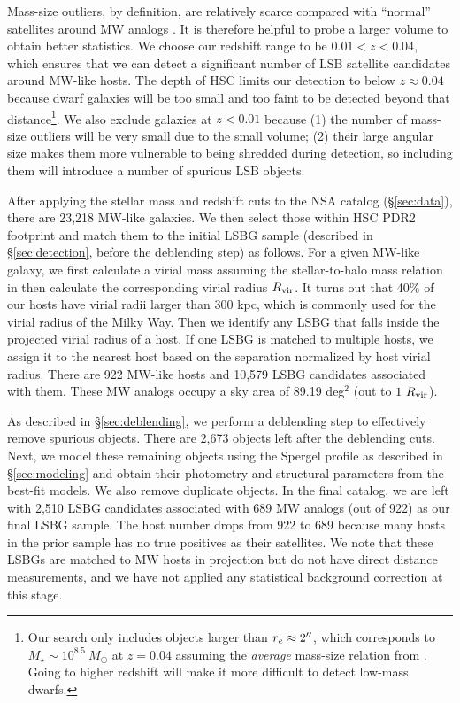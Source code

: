 \documentclass[twocolumn,astrosymb,twocolappendix]{aastex631}
\begin{document}
\begin{CJK*}{UTF8}{gbsn}
Mass-size outliers, by definition, are relatively scarce compared with ``normal'' satellites around MW analogs \citep{SAGA-II,CarlstenELVES2022}. It is therefore helpful to probe a larger volume to obtain better statistics. We choose our redshift range to be $0.01 < z < 0.04$, which ensures that we can detect a significant number of LSB satellite candidates around MW-like hosts. The depth of HSC limits our detection to below $z \approx 0.04$ because dwarf galaxies will be too small and too faint to be detected beyond that distance\footnote{Our search only includes objects larger than $r_e\approx 2\mbox{$^{\prime\prime}$}$, which corresponds to $M_\star \sim 10^{8.5}\ M_\odot$ at $z=0.04$ assuming the \textit{average} mass-size relation from \citet{ELVES-I}. Going to higher redshift will make it more difficult to detect low-mass dwarfs.}. We also exclude galaxies at $z<0.01$ because (1) the number of mass-size outliers will be very small due to the small volume; (2) their large angular size makes them more vulnerable to being shredded during detection, so including them will introduce a number of spurious LSB objects. 

After applying the stellar mass and redshift cuts to the NSA catalog (\S\ref{sec:data}), there are 23,218 MW-like galaxies. We then select those within HSC PDR2 footprint and match them to the initial LSBG sample (described in \S \ref{sec:detection}, before the deblending step) as follows. For a given MW-like galaxy, we first calculate a virial mass assuming the stellar-to-halo mass relation in \citet{Behroozi2010} then calculate the corresponding virial radius $R_{\rm vir}$. It turns out that 40\% of our hosts have virial radii larger than 300 kpc, which is commonly used for the virial radius of the Milky Way. Then we identify any LSBG that falls inside the projected virial radius of a host. If one LSBG is matched to multiple hosts, we assign it to the nearest host based on the separation normalized by host virial radius. There are 922 MW-like hosts and 10,579 LSBG candidates associated with them. These MW analogs occupy a sky area of 89.19 deg$^{2}$ (out to $1\ R_{\rm vir}$).

As described in \S\ref{sec:deblending}, we perform a deblending step to effectively remove spurious objects. There are 2,673 objects left after the deblending cuts. Next, we model these remaining objects using the Spergel profile as described in \S\ref{sec:modeling} and obtain their photometry and structural parameters from the best-fit models. We also remove duplicate objects. In the final catalog, we are left with 2,510 LSBG candidates associated with 689 MW analogs (out of 922) as our final LSBG sample. The host number drops from 922 to 689 because many hosts in the prior sample has no true positives as their satellites. We note that these LSBGs are matched to MW hosts in projection but do not have direct distance measurements, and we have not applied any statistical background correction at this stage. 



\end{CJK*}
\end{document}
